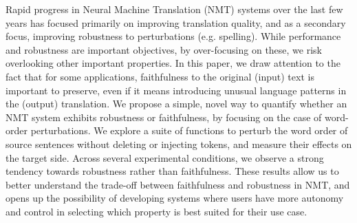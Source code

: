 Rapid progress in Neural Machine Translation (NMT) systems over the last few years has focused primarily on improving translation quality, and as a secondary focus, improving robustness to perturbations (e.g. spelling).  While performance and robustness are important objectives, by over-focusing on these, we risk overlooking other important properties.   In this paper, we draw attention to the fact that for some applications, faithfulness to the original (input) text is important to preserve, even if it means introducing unusual language patterns in the (output) translation. We propose a simple, novel way to quantify whether an NMT system exhibits robustness or faithfulness, by focusing on the case of word-order perturbations.  We explore a suite of functions to perturb the word order of source sentences without deleting or injecting tokens, and measure their effects on the target side.  Across several experimental conditions, we observe a strong tendency towards robustness rather than faithfulness.  These results allow us to better understand the trade-off between faithfulness and robustness in NMT, and opens up the possibility of developing systems where users have more autonomy and control in selecting which property is best suited for their use case.
